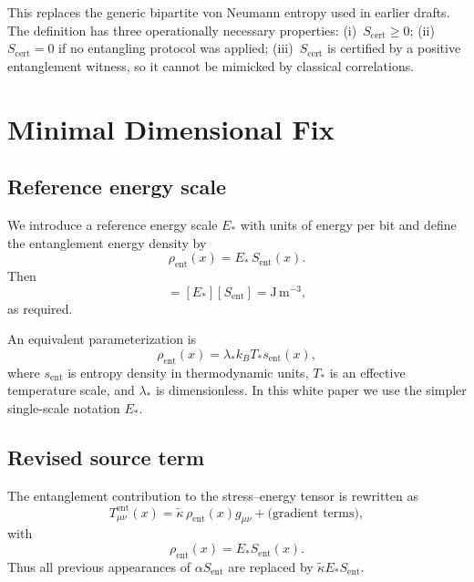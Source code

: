 \documentclass[11pt]{article}
\theoremstyle{plain}
\theoremstyle{definition}
\theoremstyle{remark}
\begin{document}
This replaces the generic bipartite von Neumann entropy used in earlier drafts.  The definition
has three operationally necessary properties:
(i)~$S_{\mathrm{cert}} \geq 0$;
(ii)~$S_{\mathrm{cert}} = 0$ if no entangling protocol was applied;
(iii)~$S_{\mathrm{cert}}$ is certified by a positive entanglement witness, so it cannot be
mimicked by classical correlations.


\section{Minimal Dimensional Fix}

\subsection{Reference energy scale}

We introduce a reference energy scale $E_*$ with units of energy per bit and define the entanglement energy density by
\begin{equation}
\rho_{\mathrm{ent}}(x) = E_*\,S_{\mathrm{ent}}(x).
\end{equation}
Then
\begin{equation}
[\rho_{\mathrm{ent}}] = [E_*][S_{\mathrm{ent}}] = \mathrm{J\,m^{-3}},
\end{equation}
as required.

An equivalent parameterization is
\begin{equation}
\rho_{\mathrm{ent}}(x) = \lambda_* k_B T_* s_{\mathrm{ent}}(x),
\end{equation}
where $s_{\mathrm{ent}}$ is entropy density in thermodynamic units, $T_*$ is an effective temperature scale, and $\lambda_*$ is dimensionless. In this white paper we use the simpler single-scale notation $E_*$.

\subsection{Revised source term}

The entanglement contribution to the stress--energy tensor is rewritten as
\begin{equation}
T^{\mathrm{ent}}_{\mu\nu}(x) = \tilde{\kappa}\,\rho_{\mathrm{ent}}(x) g_{\mu\nu} + \text{(gradient terms)},
\end{equation}
with
\begin{equation}
\rho_{\mathrm{ent}}(x) = E_* S_{\mathrm{ent}}(x).
\end{equation}
Thus all previous appearances of $\alpha S_{\mathrm{ent}}$ are replaced by $\tilde{\kappa} E_* S_{\mathrm{ent}}$.
\end{document}
